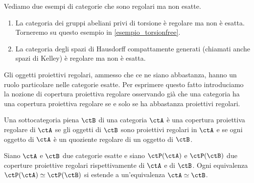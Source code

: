 \begin{examples}\label{ex_non_esatte}
 Vediamo due esempi di categorie che sono regolari ma non esatte.
 \begin{enumerate}
  \item La categoria dei gruppi abeliani privi di torsione è regolare ma non è esatta. Torneremo su questo esempio
        in \ref{esempio_torsionfree}.
  \item La categoria degli spazi di Hausdorff compattamente generati (chiamati anche spazi di Kelley) è regolare ma
        non è esatta.
 \end{enumerate}
\end{examples}

Gli oggetti proiettivi regolari, ammesso che ce ne siano abbastanza, hanno un ruolo particolare nelle categorie esatte.
Per esprimere questo fatto introduciamo la nozione di copertura proiettiva regolare osservando già che una categoria
ha una copertura proiettiva regolare se e solo se ha abbastanza proiettivi regolari.

\begin{definition}\label{def_cop_proiettiva}
 Una sottocategoria piena \(\ctB\) di una categoria \(\ctA\) è una copertura proiettiva regolare di \(\ctA\) se gli oggetti di
 \(\ctB\) sono proiettivi regolari in \(\ctA\) e se ogni oggetto di \(\ctA\) è un quoziente regolare di un oggetto di \(\ctB\).
\end{definition}

\begin{proposition}\label{prop_cop_proiettiva}
 Siano \(\ctA\) e \(\ctB\) due categorie esatte e siano \(\ctP(\ctA)\) e \(\ctP(\ctB)\) due coperture proiettive regolari
 rispettivamente di \(\ctA\) e di \(\ctB\). Ogni equivalenza \(\ctP(\ctA) \simeq \ctP(\ctB)\) si estende a un'equivalenza
 \(\ctA \simeq \ctB\).
\end{proposition}


